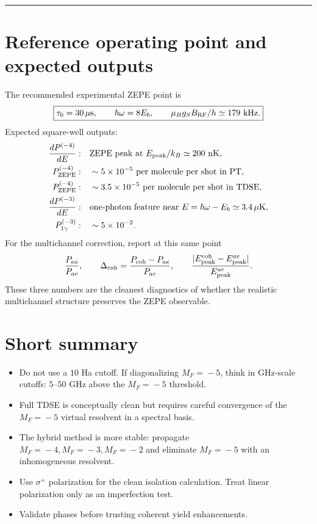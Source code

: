 \documentclass[11pt,a4paper]{article}
\newcommand{\MF}[1]{M_F\!=\!#1}
\begin{document}
\medskip\hrule\medskip

\section{Reference operating point and expected outputs}

The recommended experimental ZEPE point is
\begin{equation}
\boxed{\tau_0=30\,\mu{\rm s},\qquad \hbar\omega=8E_b,
\qquad \mu_Bg_SB_{\rm RF}/h\simeq179\ {\rm kHz}.}
\end{equation}
Expected square-well outputs:
\begin{align}
\frac{dP^{(-4)}}{dE}:&\quad \text{ZEPE peak at }E_{\rm peak}/k_B\simeq200\ {\rm nK},\\
P_{\rm ZEPE}^{(-4)}:&\quad \sim5\times10^{-5}\text{ per molecule per shot in PT},\\
P_{\rm ZEPE}^{(-4)}:&\quad \sim3.5\times10^{-5}\text{ per molecule per shot in TDSE},\\
\frac{dP^{(-3)}}{dE}:&\quad \text{one-photon feature near }E=\hbar\omega-E_b\simeq3.4\,\mu{\rm K},\\
P_{1\gamma}^{(-3)}:&\quad \sim5\times10^{-2}.
\end{align}
For the multichannel correction, report at this same point
\begin{equation}
\frac{P_{ea}}{P_{ae}},
\qquad
\Delta_{\rm coh}=\frac{P_{\rm coh}-P_{ae}}{P_{ae}},
\qquad
\frac{|E_{\rm peak}^{\rm coh}-E_{\rm peak}^{ae}|}{E_{\rm peak}^{ae}}.
\end{equation}
These three numbers are the cleanest diagnostics of whether the realistic
multichannel structure preserves the ZEPE observable.

\section{Short summary}

\begin{itemize}[leftmargin=2em,itemsep=2pt]
\item Do not use a $10$ Ha cutoff.  If diagonalizing $\MF{-5}$, think in
GHz-scale cutoffs: $5$--$50$ GHz above the $\MF{-5}$ threshold.
\item Full TDSE is conceptually clean but requires careful convergence of the
$\MF{-5}$ virtual resolvent in a spectral basis.
\item The hybrid method is more stable: propagate $\MF{-4},\MF{-3},\MF{-2}$ and
eliminate $\MF{-5}$ with an inhomogeneous resolvent.
\item Use $\sigma^+$ polarization for the clean isolation calculation.  Treat
linear polarization only as an imperfection test.
\item Validate phases before trusting coherent yield enhancements.
\end{itemize}
\end{document}
